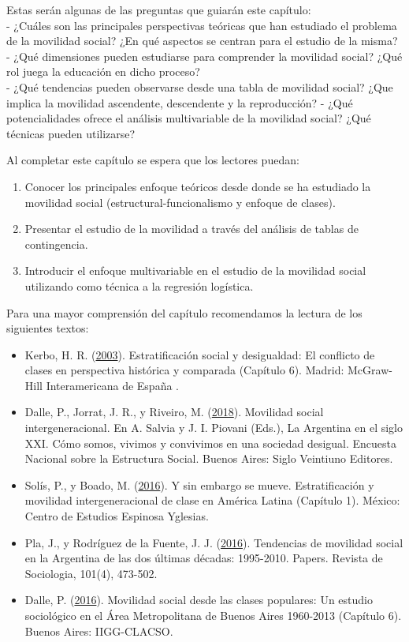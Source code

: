 \documentclass[
]{article}
\providecommand{\tightlist}{%
  \setlength{\itemsep}{0pt}\setlength{\parskip}{0pt}}
\begin{document}
Estas serán algunas de las preguntas que guiarán este capítulo:\\
- ¿Cuáles son las principales perspectivas teóricas que han estudiado el problema de la movilidad social? ¿En qué aspectos se centran para el estudio de la misma?\\
- ¿Qué dimensiones pueden estudiarse para comprender la movilidad social? ¿Qué rol juega la educación en dicho proceso?\\
- ¿Qué tendencias pueden observarse desde una tabla de movilidad social? ¿Que implica la movilidad ascendente, descendente y la reproducción?
- ¿Qué potencialidades ofrece el análisis multivariable de la movilidad social? ¿Qué técnicas pueden utilizarse?

Al completar este capítulo se espera que los lectores puedan:

\begin{enumerate}
\def\labelenumi{\arabic{enumi}.}
\tightlist
\item
  Conocer los principales enfoque teóricos desde donde se ha estudiado la movilidad social (estructural-funcionalismo y enfoque de clases).\\
\item
  Presentar el estudio de la movilidad a través del análisis de tablas de contingencia.\\
\item
  Introducir el enfoque multivariable en el estudio de la movilidad social utilizando como técnica a la regresión logística.
\end{enumerate}

Para una mayor comprensión del capítulo recomendamos la lectura de los siguientes textos:

\begin{itemize}
\item
  Kerbo, H. R. (\protect\hyperlink{ref-Kerbo2003}{2003}). Estratificación social y desigualdad: El conflicto de clases en perspectiva histórica y comparada (Capítulo 6). Madrid: McGraw-Hill Interamericana de España .
\item
  Dalle, P., Jorrat, J. R., y Riveiro, M. (\protect\hyperlink{ref-Dalle.etal2018}{2018}). Movilidad social intergeneracional. En A. Salvia y J. I. Piovani (Eds.), La Argentina en el siglo XXI. Cómo somos, vivimos y convivimos en una sociedad desigual. Encuesta Nacional sobre la Estructura Social. Buenos Aires: Siglo Veintiuno Editores.
\item
  Solís, P., y Boado, M. (\protect\hyperlink{ref-Solis.Boado2016}{2016}). Y sin embargo se mueve. Estratificación y movilidad intergeneracional de clase en América Latina (Capítulo 1). México: Centro de Estudios Espinosa Yglesias.
\item
  Pla, J., y Rodríguez de la Fuente, J. J. (\protect\hyperlink{ref-Pla.RodriguezdelaFuente2016}{2016}). Tendencias de movilidad social en la Argentina de las dos últimas décadas: 1995-2010. Papers. Revista de Sociologia, 101(4), 473-502.
\item
  Dalle, P. (\protect\hyperlink{ref-Dalle2016}{2016}). Movilidad social desde las clases populares: Un estudio sociológico en el Área Metropolitana de Buenos Aires 1960-2013 (Capítulo 6). Buenos Aires: IIGG-CLACSO.
\end{itemize}
\end{document}
